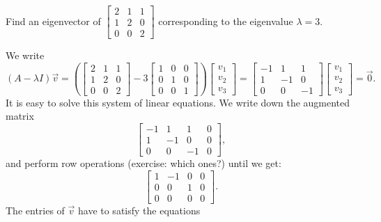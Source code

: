 \documentclass[12pt]{book}
\begin{document}
\begin{example}
Find an eigenvector of
$\left[ \begin{smallmatrix}
2 & 1 & 1 \\
1 & 2 & 0 \\
0 & 0 & 2
\end{smallmatrix} \right]$ corresponding to the eigenvalue $\lambda = 3$.

We write
\begin{equation*}
(A-\lambda I) \vec{v} = 
\left(
\begin{bmatrix}
2 & 1 & 1 \\
1 & 2 & 0 \\
0 & 0 & 2
\end{bmatrix}
- 3
\begin{bmatrix}
1 & 0 & 0 \\
0 & 1 & 0 \\
0 & 0 & 1
\end{bmatrix}
\right)
\begin{bmatrix}
v_1 \\ v_2 \\ v_3
\end{bmatrix}
=
\begin{bmatrix}
-1 & 1 & 1 \\
1 & -1 & 0 \\
0 & 0 & -1
\end{bmatrix}
\begin{bmatrix}
v_1 \\ v_2 \\ v_3
\end{bmatrix}
=
\vec{0} .
\end{equation*}
It is easy to solve this system of linear equations.  We write down the
augmented matrix
\begin{equation*}
\left[
\begin{array}{ccc|c}
-1 & 1 & 1 & 0 \\
1 & -1 & 0 & 0 \\
0 & 0 & -1 & 0
\end{array}
\right] ,
\end{equation*}
and perform row operations (exercise: which ones?) until we get:
\begin{equation*}
\left[
\begin{array}{ccc|c}
1 & -1 & 0 & 0 \\
0 & 0 & 1 & 0 \\
0 & 0 & 0 & 0
\end{array}
\right] .
\end{equation*}
The entries of $\vec{v}$ have to satisfy the equations

\end{example}
\end{document}
